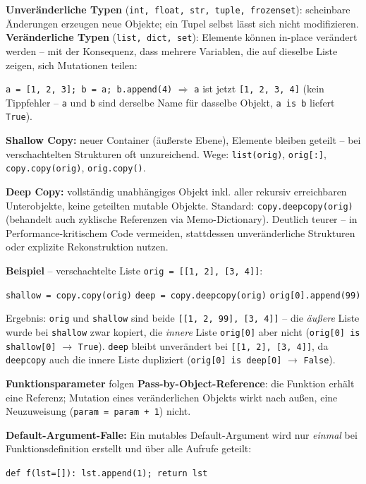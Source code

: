 \textbf{Unveränderliche Typen} (\texttt{int, float, str, tuple, frozenset}): scheinbare Änderungen erzeugen neue Objekte; ein Tupel selbst lässt sich nicht modifizieren. \textbf{Veränderliche Typen} (\texttt{list, dict, set}): Elemente können in-place verändert werden -- mit der Konsequenz, dass mehrere Variablen, die auf dieselbe Liste zeigen, sich Mutationen teilen:

\texttt{a = [1, 2, 3]; b = a; b.append(4)} \quad $\Rightarrow$ \quad \texttt{a} ist jetzt \texttt{[1, 2, 3, 4]} (kein Tippfehler -- \texttt{a} und \texttt{b} sind derselbe Name für dasselbe Objekt, \texttt{a is b} liefert \texttt{True}).

\textbf{Shallow Copy:} neuer Container (äußerste Ebene), Elemente bleiben geteilt -- bei verschachtelten Strukturen oft unzureichend. Wege: \texttt{list(orig)}, \texttt{orig[:]}, \texttt{copy.copy(orig)}, \texttt{orig.copy()}.

\textbf{Deep Copy:} vollständig unabhängiges Objekt inkl. aller rekursiv erreichbaren Unterobjekte, keine geteilten mutable Objekte. Standard: \texttt{copy.deepcopy(orig)} (behandelt auch zyklische Referenzen via Memo-Dictionary). Deutlich teurer -- in Performance-kritischem Code vermeiden, stattdessen unveränderliche Strukturen oder explizite Rekonstruktion nutzen.

\textbf{Beispiel} -- verschachtelte Liste \texttt{orig = [[1, 2], [3, 4]]}:
\begin{center}
\texttt{shallow = copy.copy(orig)} \quad\quad \texttt{deep = copy.deepcopy(orig)} \quad\quad \texttt{orig[0].append(99)}
\end{center}
Ergebnis: \texttt{orig} und \texttt{shallow} sind beide \texttt{[[1, 2, 99], [3, 4]]} -- die \emph{äußere} Liste wurde bei \texttt{shallow} zwar kopiert, die \emph{innere} Liste \texttt{orig[0]} aber nicht (\texttt{orig[0] is shallow[0]} $\to$ \texttt{True}). \texttt{deep} bleibt unverändert bei \texttt{[[1, 2], [3, 4]]}, da \texttt{deepcopy} auch die innere Liste dupliziert (\texttt{orig[0] is deep[0]} $\to$ \texttt{False}).

\textbf{Funktionsparameter} folgen \textbf{Pass-by-Object-Reference}: die Funktion erhält eine Referenz; Mutation eines veränderlichen Objekts wirkt nach außen, eine Neuzuweisung (\texttt{param = param + 1}) nicht.

\textbf{Default-Argument-Falle:} Ein mutables Default-Argument wird nur \emph{einmal} bei Funktionsdefinition erstellt und über alle Aufrufe geteilt:

\texttt{def f(lst=[]):\ lst.append(1);\ return lst}

